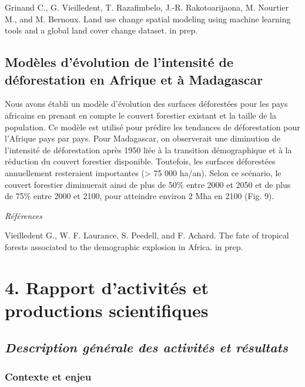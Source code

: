 \documentclass[12pt,]{article}
\begin{document}
Grinand C., G. Vieilledent, T. Razafimbelo, J.-R. Rakotoarijaona, M.
Nourtier M., and M. Bernoux. Land use change spatial modeling using
machine learning tools and a global land cover change dataset. in prep.

\hypertarget{modeles-devolution-de-lintensite-de-deforestation-en-afrique-et-a-madagascar}{%
\subsection{Modèles d'évolution de l'intensité de déforestation en
Afrique et à
Madagascar}\label{modeles-devolution-de-lintensite-de-deforestation-en-afrique-et-a-madagascar}}

Nous avons établi un modèle d'évolution des surfaces déforestées pour
les pays africains en prenant en compte le couvert forestier existant et
la taille de la population. Ce modèle est utilisé pour prédire les
tendances de déforestation pour l'Afrique pays par pays. Pour
Madagascar, on observerait une diminution de l'intensité de
déforestation après 1950 liée à la transition démographique et à la
réduction du couvert forestier disponible. Toutefois, les surfaces
déforestées annuellement resteraient importantes (\textgreater{} 75 000
ha/an). Selon ce scénario, le couvert forestier diminuerait ainsi de
plus de 50\% entre 2000 et 2050 et de plus de 75\% entre 2000 et 2100,
pour atteindre environ 2 Mha en 2100 (Fig. 9).

\emph{Références}

Vieilledent G., W. F. Laurance, S. Peedell, and F. Achard. The fate of
tropical forests associated to the demographic explosion in Africa. in
prep.

\hypertarget{rapport-dactivites-et-productions-scientifiques}{%
\section{4. Rapport d'activités et productions
scientifiques}\label{rapport-dactivites-et-productions-scientifiques}}

\hypertarget{description-generale-des-activites-et-resultats}{%
\subsection{\texorpdfstring{\emph{Description générale des activités et
résultats}}{Description générale des activités et résultats}}\label{description-generale-des-activites-et-resultats}}

\hypertarget{contexte-et-enjeu}{%
\subsubsection{Contexte et enjeu}\label{contexte-et-enjeu}}
\end{document}
